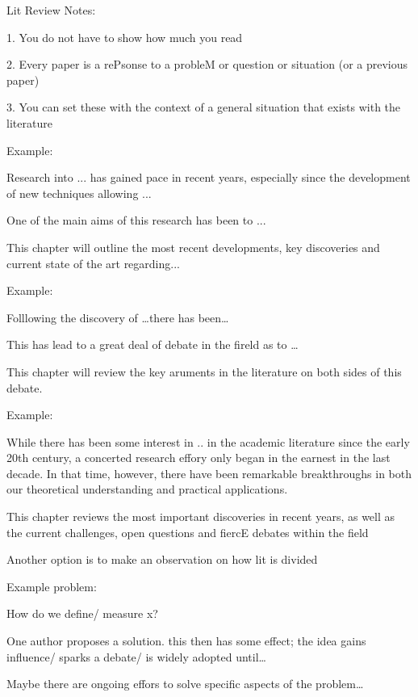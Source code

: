 
Lit Review Notes:

1. You do not have to show how much you read 

2. Every paper is a rePsonse to a probleM or question or situation (or a previous
paper)

3. You can set these with the context of a general situation that exists with 
the literature

Example:

Research into ... has gained pace in recent years, especially since the development
of new techniques allowing ...

One of the main aims of this research has been to ...

This chapter will outline the most recent developments, key discoveries and 
current state of the art regarding...

Example:

Folllowing the discovery of \ldots there has been\ldots

This has lead to a great deal of debate in the fireld as to \ldots

This chapter will review the key aruments in the literature on both sides of this 
debate.

Example:

While there has been some interest in .. in the academic literature since the 
early 20th century, a concerted research effory only began in the earnest in the 
last decade. In that time, however, there have been remarkable breakthroughs in 
both our theoretical understanding and practical applications. 

This chapter reviews the most important discoveries in recent years, as well as 
the current challenges, open questions and fiercE debates within the field 

Another option is to make an observation on how lit is divided 

Example problem:

How do we define/ measure x?

One author proposes a solution. this then has some effect; the idea gains 
influence/ sparks a debate/ is widely adopted until\ldots

Maybe there are ongoing effors to solve specific aspects of the problem\ldots




